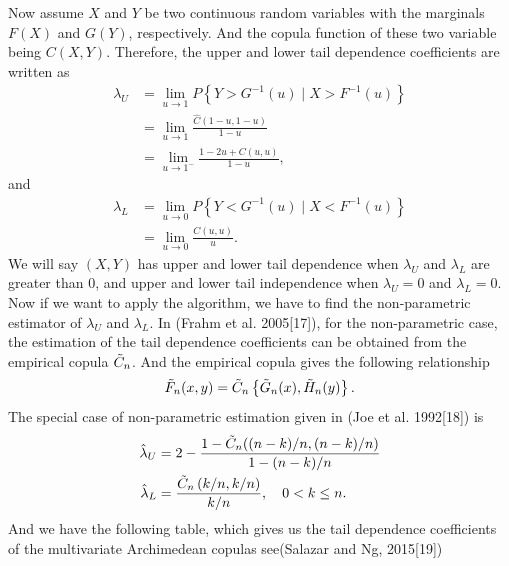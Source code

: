 \documentclass[mstat,12pt]{unswthesis}  %
\numberwithin{equation}{section}
\begin{document}
Now assume $X$ and $Y$ be two continuous random variables with the marginals $F(X)$ and $G(Y)$, respectively. And the copula function of these two variable being $C(X,Y)$. Therefore, the upper and lower tail dependence coefficients are written as
\begin{equation}
\begin{split}
\lambda_{U}&=\lim _{u \rightarrow 1} P\left\{Y>G^{-1}(u) \mid X>F^{-1}(u)\right\}\\
&=\lim _{u \rightarrow 1} \frac{\hat{C}(1-u, 1-u)}{1-u}\\
&=\lim _{u \rightarrow 1^{-}} \frac{1-2 u+C(u,u)}{1-u},
    \end{split}
\end{equation}
and 
\begin{equation}
\begin{split}
\lambda_{L}&=\lim _{u \rightarrow 0} P\left\{Y<G^{-1}(u) \mid X<F^{-1}(u)\right\}\\
&=\lim _{u \rightarrow 0} \frac{C(u, u)}{u}.
\end{split}
\end{equation}
We will say $(X,Y)$ has upper and lower tail dependence when $\lambda_U$ and $\lambda_L$ are greater than 0, and upper and lower tail independence when $\lambda_U = 0$ and $\lambda_L = 0$.
Now if we want to apply the algorithm, we have to find the non-parametric estimator of $\lambda_U$ and $\lambda_L$. In (Frahm et al. 2005[17]), for the non-parametric case, the estimation of the tail dependence coefficients can be obtained from the empirical copula $\Tilde{C}_n$. And the empirical copula gives the following relationship
\begin{equation}
\Tilde{F}_{n}(x, y)=\Tilde{C}_{n}\left\{\Tilde{G}_{n}(x), \Tilde{H}_{n}(y)\right\}.
\end{equation}
The special case of non-parametric estimation given in (Joe et al. 1992[18]) is
\begin{equation}
\begin{split}
\hat{\lambda}_{U}&=2-\frac{1-\Tilde{C}_{n}((n-k) / n,(n-k) / n)}{1-(n-k) / n}\\
\hat{\lambda}_{L}&=\frac{\Tilde{C}_{n}\left(k/n, k/n\right)}{k/n}, \quad 0<k \leq n.
\end{split}
\end{equation}
And we have the following table, which gives us the tail dependence coefficients of the multivariate Archimedean copulas see(Salazar
and Ng, 2015[19])\\
\end{document}
